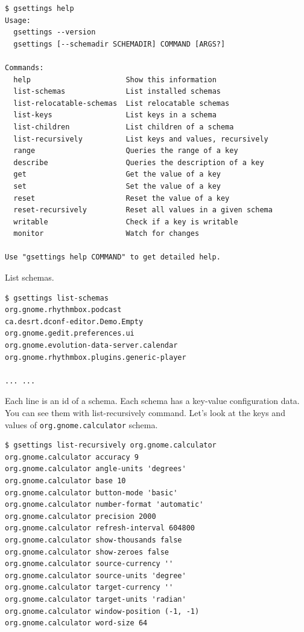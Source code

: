 \begin{lstlisting}
$ gsettings help
Usage:
  gsettings --version
  gsettings [--schemadir SCHEMADIR] COMMAND [ARGS?]

Commands:
  help                      Show this information
  list-schemas              List installed schemas
  list-relocatable-schemas  List relocatable schemas
  list-keys                 List keys in a schema
  list-children             List children of a schema
  list-recursively          List keys and values, recursively
  range                     Queries the range of a key
  describe                  Queries the description of a key
  get                       Get the value of a key
  set                       Set the value of a key
  reset                     Reset the value of a key
  reset-recursively         Reset all values in a given schema
  writable                  Check if a key is writable
  monitor                   Watch for changes

Use "gsettings help COMMAND" to get detailed help.
\end{lstlisting}

List schemas.

\begin{lstlisting}
$ gsettings list-schemas
org.gnome.rhythmbox.podcast
ca.desrt.dconf-editor.Demo.Empty
org.gnome.gedit.preferences.ui
org.gnome.evolution-data-server.calendar
org.gnome.rhythmbox.plugins.generic-player

... ...
\end{lstlisting}

Each line is an id of a schema. Each schema has a key-value
configuration data. You can see them with list-recursively command.
Let's look at the keys and values of
\passthrough{\lstinline!org.gnome.calculator!} schema.

\begin{lstlisting}
$ gsettings list-recursively org.gnome.calculator
org.gnome.calculator accuracy 9
org.gnome.calculator angle-units 'degrees'
org.gnome.calculator base 10
org.gnome.calculator button-mode 'basic'
org.gnome.calculator number-format 'automatic'
org.gnome.calculator precision 2000
org.gnome.calculator refresh-interval 604800
org.gnome.calculator show-thousands false
org.gnome.calculator show-zeroes false
org.gnome.calculator source-currency ''
org.gnome.calculator source-units 'degree'
org.gnome.calculator target-currency ''
org.gnome.calculator target-units 'radian'
org.gnome.calculator window-position (-1, -1)
org.gnome.calculator word-size 64
\end{lstlisting}

